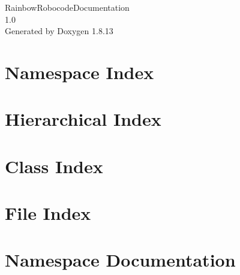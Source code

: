 \documentclass[twoside]{book}
\newcommand{\+}{\discretionary{\mbox{\scriptsize$\hookleftarrow$}}{}{}}
\newcommand{\clearemptydoublepage}{%
  \newpage{\pagestyle{empty}\cleardoublepage}%
}
\begin{document}
\hypersetup{pageanchor=false,
             bookmarksnumbered=true,
             pdfencoding=unicode
            }
\begin{titlepage}
\vspace*{7cm}
\begin{center}%
{\Large Rainbow\+Robocode\+Documentation \\[1ex]\large 1.\+0 }\\
\vspace*{1cm}
{\large Generated by Doxygen 1.8.13}\\
\end{center}
\end{titlepage}
\clearemptydoublepage
{}
\tableofcontents
\clearemptydoublepage
{}
\hypersetup{pageanchor=true}

\chapter{Namespace Index}

\chapter{Hierarchical Index}

\chapter{Class Index}

\chapter{File Index}

\chapter{Namespace Documentation}


\end{document}
